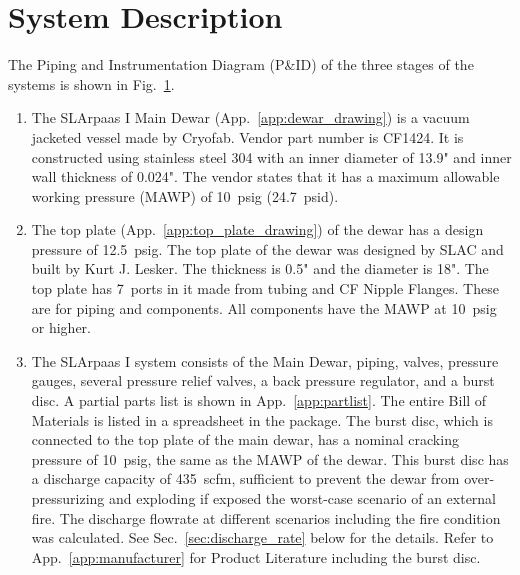 \section{System Description}
\label{sec:system}

The Piping and Instrumentation Diagram (P\&ID) of the three stages
of the systems is shown in Fig.~\ref{fig:PID}.

\begin{figure}[h]
    \centering
    \caption{}
    \label{fig:PID}
\end{figure}

\begin{enumerate}
    \item The SLArpaas I Main Dewar (App.~\ref{app:dewar_drawing}) is a vacuum jacketed 
    vessel made by Cryofab. Vendor part number is CF1424.
    It is constructed using stainless steel 304 with an inner diameter of 13.9" 
    and inner wall thickness of 0.024". 
    The vendor states that it has a maximum allowable working pressure (MAWP) 
    of 10~psig (24.7~psid).
    \item The top plate (App.~\ref{app:top_plate_drawing}) of the dewar has a design 
    pressure of 12.5~psig. 
    The top plate of the dewar was designed by SLAC and built by Kurt J. Lesker.
    The thickness is 0.5" and the diameter is 18". 
    The top plate has 7~ports in it made from tubing and CF Nipple Flanges. 
    These are for piping and components. All components have the MAWP at 10~psig or higher.
    \item The SLArpaas I system consists of the Main Dewar, piping, valves, pressure gauges, 
    several pressure relief valves, a back pressure regulator, and a burst disc. 
    A partial parts list is shown in App.~\ref{app:partlist}. 
    The entire Bill of Materials is listed in a spreadsheet in the package. 
    The burst disc, which is connected to the top plate of the main dewar, 
    has a nominal cracking pressure of 10~psig, the same as the MAWP of the dewar. 
    This burst disc has a discharge capacity of 435~scfm, sufficient to prevent the dewar 
    from over-pressurizing and exploding if exposed the worst-case scenario of an external fire. 
    The discharge flowrate at different scenarios including the fire condition was calculated. 
    See Sec.~\ref{sec:discharge_rate} below for the details. 
    Refer to App.~\ref{app:manufacturer} for Product Literature including the burst disc.

\end{enumerate}
